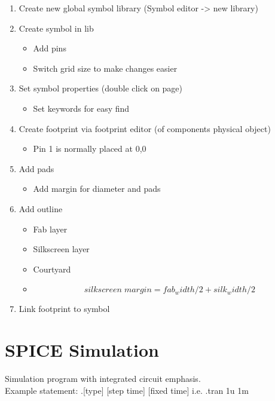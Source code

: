 \documentclass[11pt]{scrartcl} %
\begin{document}
\begin{enumerate}
	\item Create new global symbol library (Symbol editor -> new library)
	\item Create symbol in lib
	\begin{itemize}
		\item Add pins
		\item Switch grid size to make changes easier
	\end{itemize}
	\item Set symbol properties (double click on page)
	\begin{itemize}
		\item Set keywords for easy find
	\end{itemize}
	\item Create footprint via footprint editor (of components physical object)
	\begin{itemize}
		\item Pin 1 is normally placed at 0,0
	\end{itemize}
	\item Add pads
	\begin{itemize}
		\item Add margin for diameter and pads
	\end{itemize}
	\item Add outline
	\begin{itemize}
		\item Fab layer
		\item Silkscreen layer
		\item Courtyard
		\item \[ silkscreen\;margin = fab_width/2 + silk_width/2 \] 
	\end{itemize}
	\item Link footprint to symbol
\end{enumerate}

\section{SPICE Simulation}

Simulation program with integrated circuit emphasis.\\

Example statement: .[type] [step time] [fixed time] i.e. .tran 1u 1m
\end{document}
